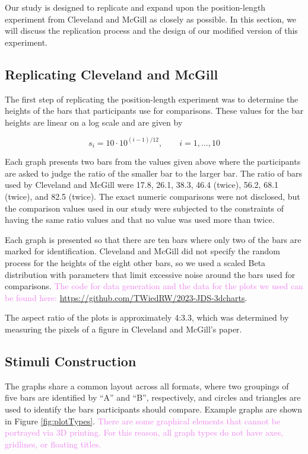 \documentclass[letterpaper,inpress,dvipsnames]{jdsart}
\begin{document}
Our study is designed to replicate and expand upon the position-length experiment from Cleveland and McGill as closely as possible.
In this section, we will discuss the replication process and the design of our modified version of this experiment.

\hypertarget{replicating-cleveland-and-mcgill}{%
\subsection{Replicating Cleveland and McGill}\label{replicating-cleveland-and-mcgill}}

The first step of replicating the position-length experiment was to determine the heights of the bars that participants use for comparisons.
These values for the bar heights are linear on a log scale and are given by

\[s_i=10\cdot 10^{(i-1)/12}, \qquad i=1,...,10\]

Each graph presents two bars from the values given above where the participants are asked to judge the ratio of the smaller bar to the larger bar. The ratio of bars used by Cleveland and McGill were 17.8, 26.1, 38.3, 46.4 (twice), 56.2, 68.1 (twice), and 82.5 (twice).
The exact numeric comparisons were not disclosed, but the comparison values used in our study were subjected to the constraints of having the same ratio values and that no value was used more than twice.

Each graph is presented so that there are ten bars where only two of the bars are marked for identification.
Cleveland and McGill did not specify the random process for the heights of the eight other bars, so we used a scaled Beta distribution with parameters that limit excessive noise around the bars used for comparisons.
{\textcolor{Violet}{The code for data generation and the data for the plots we used can be found here:}} \url{https://github.com/TWiedRW/2023-JDS-3dcharts}.

The aspect ratio of the plots is approximately 4:3.3, which was determined by measuring the pixels of a figure in Cleveland and McGill's paper.

\hypertarget{stimuli-construction}{%
\subsection{Stimuli Construction}\label{stimuli-construction}}

The graphs share a common layout across all formats, where two groupings of five bars are identified by ``A'' and ``B'', respectively, and circles and triangles are used to identify the bars participants should compare. Example graphs are shown in
Figure \ref{fig:plotTypes}.
{\textcolor{Violet}{There are some graphical elements that cannot be portrayed via 3D printing. For this reason, all graph types do not have axes, gridlines, or floating titles.}}
\end{document}
